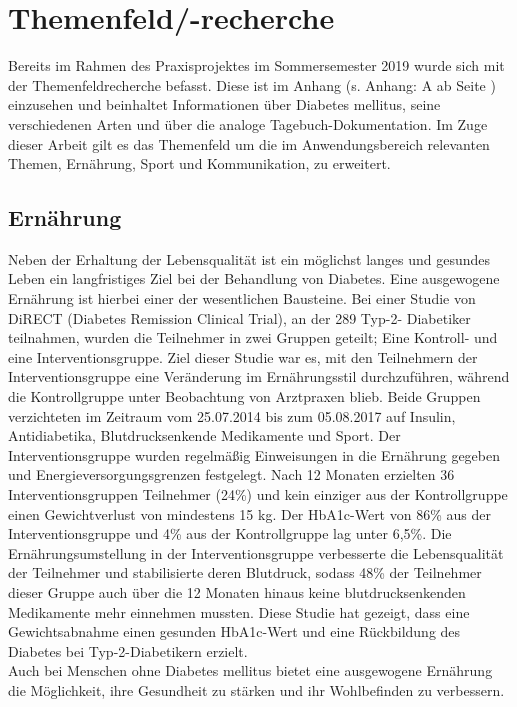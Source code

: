 \section{Themenfeld/-recherche}
	Bereits im Rahmen des Praxisprojektes im Sommersemester 2019 wurde sich mit der Themenfeldrecherche befasst. Diese ist im Anhang (s. Anhang: A  ab Seite \pageref{section:Themenfeld}) einzusehen und beinhaltet Informationen über Diabetes mellitus, seine verschiedenen Arten und über die analoge Tagebuch-Dokumentation. Im Zuge dieser Arbeit gilt es das Themenfeld um die im Anwendungsbereich relevanten Themen, Ernährung, Sport und Kommunikation, zu erweitert.
	\subsection{Ernährung}
		Neben der Erhaltung der Lebensqualität ist ein möglichst langes und gesundes Leben ein langfristiges Ziel bei der Behandlung von Diabetes. Eine ausgewogene Ernährung ist hierbei einer der wesentlichen Bausteine. \newline
		Bei einer Studie von DiRECT (Diabetes Remission Clinical Trial), an der 289 Typ-2- Diabetiker teilnahmen, wurden die Teilnehmer in zwei Gruppen geteilt; Eine Kontroll- und eine Interventionsgruppe. Ziel dieser Studie war es, mit den Teilnehmern der Interventionsgruppe eine Veränderung im Ernährungsstil durchzuführen, während die Kontrollgruppe unter Beobachtung von Arztpraxen blieb. Beide Gruppen verzichteten im Zeitraum vom 25.07.2014 bis zum 05.08.2017 auf Insulin, Antidiabetika, Blutdrucksenkende Medikamente und Sport. Der Interventionsgruppe wurden  regelmäßig Einweisungen in die Ernährung gegeben und Energieversorgungsgrenzen festgelegt. Nach 12 Monaten erzielten 36 Interventionsgruppen Teilnehmer (24\%) und kein einziger aus der Kontrollgruppe einen Gewichtverlust von mindestens 15 kg. Der HbA1c-Wert von 86\% aus der Interventionsgruppe und 4\% aus der Kontrollgruppe lag unter 6,5\%. Die Ernährungsumstellung in der Interventionsgruppe verbesserte die Lebensqualität der Teilnehmer und stabilisierte deren Blutdruck, sodass 48\% der Teilnehmer dieser Gruppe auch über die 12 Monaten hinaus keine blutdrucksenkenden Medikamente mehr einnehmen mussten. Diese Studie hat gezeigt, dass eine Gewichtsabnahme  einen gesunden HbA1c-Wert und eine Rückbildung des Diabetes bei Typ-2-Diabetikern erzielt. \\
		Auch bei Menschen ohne Diabetes mellitus bietet eine ausgewogene Ernährung die Möglichkeit, ihre Gesundheit zu stärken und ihr Wohlbefinden zu verbessern.\newline	
